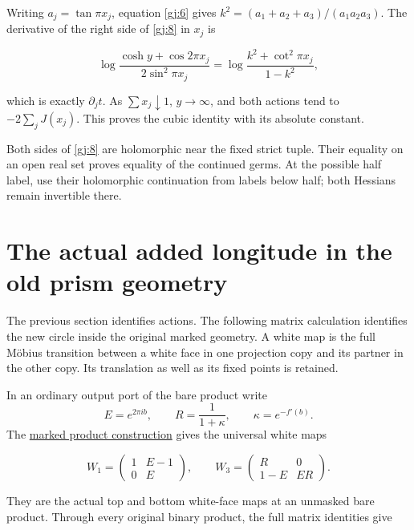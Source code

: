 Writing \(a_j=\tan\pi x_j\), equation \eqref{gj:6} gives
\(k^2=(a_1+a_2+a_3)/(a_1a_2a_3)\).
The derivative of the right side of \eqref{gj:8} in \(x_j\) is

\begin{equation}\label{gj:14}
\log\frac{\cosh y+\cos2\pi x_j}{2\sin^2\pi x_j}
   =\log\frac{k^2+\cot^2\pi x_j}{1-k^2},
\end{equation}

which is exactly \(\partial_jt\). As \(\sum x_j\downarrow1\), \(y\to\infty\), and both actions tend to \(-2\sum_jJ(x_j)\). This proves the cubic identity with its absolute constant.

Both sides of \eqref{gj:8} are holomorphic near the fixed strict tuple. Their equality on an open real set proves equality of the continued germs. At the possible half label, use their holomorphic continuation from labels below half; both Hessians remain invertible there.

\section{The actual added longitude in the old prism geometry}\label{gj:the-actual-added-longitude-in-the-old-prism-geometry}

The previous section identifies actions. The following matrix calculation identifies the new circle inside the
original marked geometry. A white map is the full Möbius transition
between a white face in one projection copy and its partner in the
other copy. Its translation as well as its fixed points is retained.

In an ordinary output port of the bare product write
\[
 E=e^{2\pi ib},\qquad R=\frac1{1+\kappa},\qquad
 \kappa=e^{-f'(b)}.
\]
The \href{https://sashakolpakov.github.io/murakamis_dream/notes/actual_conway_general_mask_marked_filling.html\#actual-and-virtual-white-maps-for-every-mask}{marked product construction}
gives the universal white maps

\begin{equation}\label{gj:15}
W_1=\begin{pmatrix}1&E-1\\0&E\end{pmatrix},\qquad
 W_3=\begin{pmatrix}R&0\\1-E&ER\end{pmatrix}.
\end{equation}

They are the actual top and bottom white-face maps at an unmasked bare product. Through every original binary product, the full matrix identities give

